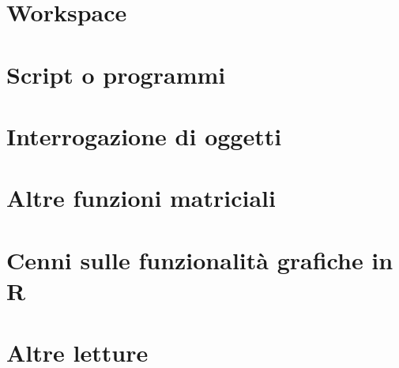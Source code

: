\documentclass[a4paper,12pt,oneside]{book}
\begin{document}
\hypertarget{workspace}{%
\section*{Workspace}\label{workspace}}

\hypertarget{script-o-programmi}{%
\section*{Script o programmi}\label{script-o-programmi}}

\hypertarget{interrogazione-di-oggetti}{%
\section*{Interrogazione di oggetti}\label{interrogazione-di-oggetti}}

\hypertarget{altre-funzioni-matriciali}{%
\section*{Altre funzioni matriciali}\label{altre-funzioni-matriciali}}

\hypertarget{cenni-sulle-funzionalituxe0-grafiche-in-r}{%
\section*{Cenni sulle funzionalità grafiche in R}\label{cenni-sulle-funzionalituxe0-grafiche-in-r}}

\hypertarget{altre-letture-9}{%
\section*{Altre letture}\label{altre-letture-9}}
\end{document}
